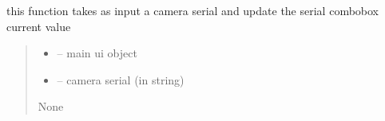 \documentclass[letterpaper,10pt,english]{sphinxmanual}
\begin{document}
\begin{savenotes}\begin{fulllineitems}
\label{\detokenize{setting/backend/camera_funcs:oxin.backend.camera_funcs.set_camera_serial_to_ui}}
\pysigstartsignatures
{}
\pysigstopsignatures
\sphinxAtStartPar
this function takes as input a camera serial and update the serial combobox current value
\begin{quote}\begin{description}
\begin{itemize}
\item {} 
\sphinxAtStartPar
{} – main ui object

\item {} 
\sphinxAtStartPar
{} – camera serial (in string)

\end{itemize}

\sphinxAtStartPar
None

\end{description}\end{quote}

\end{fulllineitems}\end{savenotes}

\end{document}
